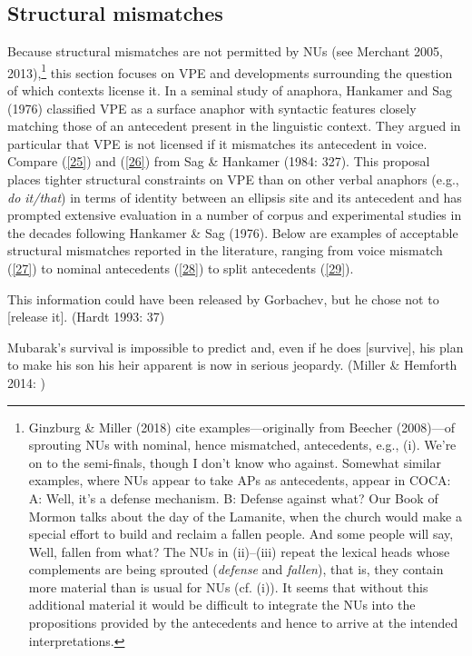 \documentclass[output=paper]{langsci/langscibook}
\begin{document}
{\subsection{Structural mismatches}
 Because structural mismatches are not permitted by NUs (see Merchant 2005, 2013),\footnote{Ginzburg \& Miller (2018) cite examples---originally from Beecher (2008)---of sprouting NUs with nominal, hence mismatched, antecedents, e.g., (i).
 \ea We're on to the semi-finals, though I don't know who against.\z
 Somewhat similar examples, where NUs appear to take APs as antecedents, appear in COCA:
 \ea  A: Well, it's a defense mechanism. B: Defense against what?\z
 \ea Our Book of Mormon talks about the day of the Lamanite, when the church would make a special effort to build and reclaim a fallen people. And some people will say, Well, fallen from what? \z
The NUs in (ii)--(iii) repeat the lexical heads whose complements are being sprouted ({\it defense} and {\it fallen}), that is, they contain more material than is usual for NUs (cf. (i)). It seems that without this additional material it would be difficult to integrate the NUs into the propositions provided by the antecedents and hence to arrive at the intended interpretations.
} this section focuses on VPE and developments surrounding the question of which contexts license it. In a seminal study of anaphora, Hankamer and Sag (1976) classified VPE as a surface anaphor with syntactic features closely matching those of an antecedent present in the linguistic context. They argued in particular that VPE is not licensed if it mismatches its antecedent in voice. Compare (\ref{25}) and (\ref{26}) from Sag \& Hankamer (1984: 327).
\z
{}
\z
This proposal places tighter structural constraints on VPE than on other verbal anaphors (e.g., \emph{do it/that}) in terms of identity between an ellipsis site and its antecedent and has prompted extensive evaluation in a number of corpus and experimental studies in the decades following Hankamer \& Sag (1976). Below are examples of acceptable structural mismatches reported in the literature, ranging from voice mismatch (\ref{27}) to nominal antecedents (\ref{28}) to split antecedents (\ref{29}).

\ea This information could have been released by Gorbachev, but he chose not to [release it]. (Hardt 1993: 37) \label{27}\z

\ea Mubarak's survival is impossible to predict and, even if he does [survive], his plan to make his son his heir apparent is now in serious jeopardy. (Miller \& Hemforth 2014: )\label{28}\z

}
\end{document}
